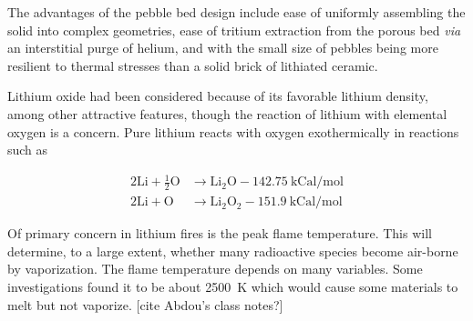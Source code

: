 The advantages of the pebble bed design include ease of uniformly assembling the solid into complex geometries, ease of tritium extraction from the porous bed \textit{via} an interstitial purge of helium, and with the small size of pebbles being more resilient to thermal stresses than a solid brick of lithiated ceramic.\cite{Casadio2004} 


Lithium oxide had been considered because of its favorable lithium density, among other attractive features, though the reaction of lithium with elemental oxygen is a concern. Pure lithium reacts with oxygen exothermically in reactions such as

\begin{subequations}
\begin{align}
	2\mathrm{Li} + \frac{1}{2}\mathrm{O} &\rightarrow \mathrm{Li}_2\mathrm{O} - 142.75\ \text{kCal/mol}\\
	2\mathrm{Li} + \mathrm{O} &\rightarrow \mathrm{Li}_2\mathrm{O}_2 - 151.9\ \text{kCal/mol}
\end{align}
\end{subequations}

Of primary concern in lithium fires is the peak flame temperature. This will determine, to a large extent, whether many radioactive species become air-borne by vaporization. The flame temperature depends on many variables. Some investigations found it to be about 2500~K which would cause some materials to melt but not vaporize. [cite Abdou's class notes?]